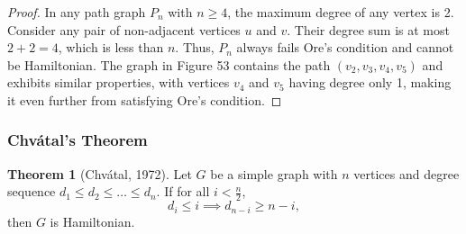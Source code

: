 \documentclass{article}
\theoremstyle{definition}
\newtheorem{theorem}{Theorem}
\begin{document}
\begin{proof}
In any path graph $P_n$ with $n \geq 4$, the maximum degree of any vertex is 2. Consider any pair of non-adjacent vertices $u$ and $v$. Their degree sum is at most $2 + 2 = 4$, which is less than $n$. Thus, $P_n$ always fails Ore's condition and cannot be Hamiltonian. The graph in Figure 53 contains the path $(v_2, v_3, v_4, v_5)$ and exhibits similar properties, with vertices $v_4$ and $v_5$ having degree only 1, making it even further from satisfying Ore's condition.
\end{proof}
\subsubsection{Chvátal's Theorem}

\begin{theorem}[Chvátal, 1972]
Let $G$ be a simple graph with $n$ vertices and degree sequence $d_1 \leq d_2 \leq \ldots \leq d_n$. If for all $i < \frac{n}{2}$, 
\[d_i \leq i \implies d_{n-i} \geq n-i,\]
then $G$ is Hamiltonian.
\end{theorem}
\end{document}
